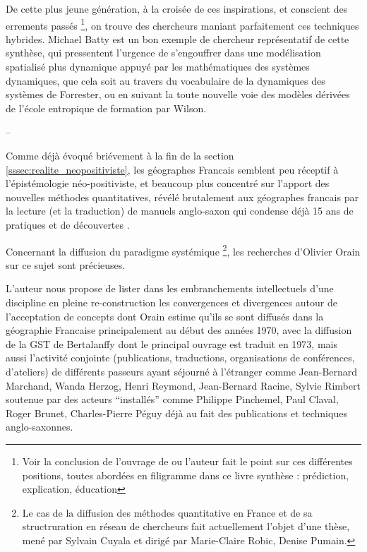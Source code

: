 De cette plus jeune génération, à la croisée de ces inspirations, et conscient des errements passés \footnote{Voir la conclusion de l'ouvrage de \textcite[357]{Batty1976} ou l'auteur fait le point sur ces différentes positions, toutes abordées en filigramme dans ce livre synthèse : prédiction, explication, éducation }, on trouve des chercheurs maniant parfaitement ces techniques hybrides. Michael Batty est un bon exemple de chercheur représentatif de cette synthèse, qui pressentent l'urgence de s'engouffrer dans une modélisation spatialisé plus dynamique \autocite{Batty1971} appuyé par les mathématiques des systèmes dynamiques, que cela soit au travers du vocabulaire de la dynamiques des systèmes de Forrester, ou en suivant la toute nouvelle voie des modèles dérivées de l'école entropique de formation par Wilson.



--

Comme déjà évoqué briévement à la fin de la section \ref{sssec:realite_neopositiviste}, les géographes Francais semblent peu réceptif à l'épistémologie néo-positiviste, et beaucoup plus concentré sur l'apport des nouvelles méthodes quantitatives, révélé brutalement aux géographes francais par la lecture (et la traduction) de manuels anglo-saxon qui condense déjà 15 ans de pratiques et de découvertes \autocite[129]{Pumain2002}. 

Concernant la diffusion du paradigme systémique \footnote{Le cas de la diffusion des méthodes quantitative en France et de sa structruration en réseau de chercheurs fait actuellement l'objet d'une thèse, mené par Sylvain Cuyala et dirigé par Marie-Claire Robic, Denise Pumain.
}, les recherches d'Olivier Orain \autocite{Orain2001} sur ce sujet sont précieuses.

L'auteur nous propose de lister dans les embranchements intellectuels d'une discipline en pleine re-construction les convergences et divergences autour de l'acceptation de concepts dont Orain estime qu'ils se sont diffusés dans la géographie Francaise principalement au début des années 1970, avec la diffusion de la GST de Bertalanffy dont le principal ouvrage est traduit en 1973, mais aussi l'activité conjointe (publications, traductions, organisations de conférences, d'ateliers) de différents passeurs ayant séjourné à l'étranger comme Jean-Bernard Marchand, Wanda Herzog, Henri Reymond, Jean-Bernard Racine, Sylvie Rimbert soutenue par des acteurs \enquote{installés} comme Philippe Pinchemel, Paul Claval, Roger Brunet, Charles-Pierre Péguy \autocite{Pumain2002,Cauvin2007} déjà au fait des publications et techniques anglo-saxonnes. 

